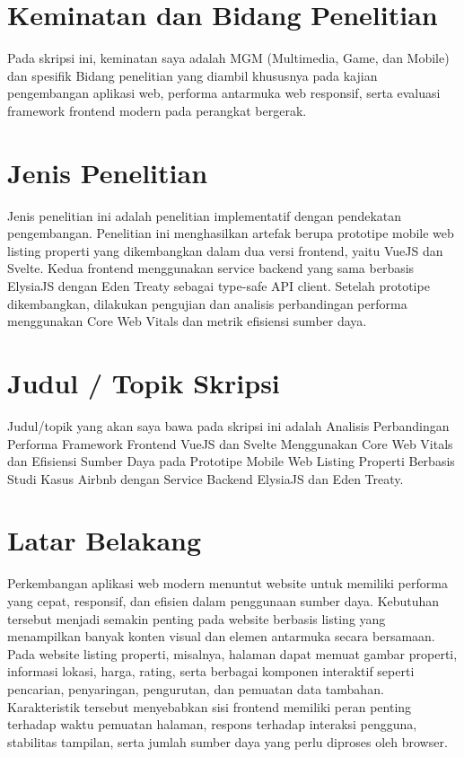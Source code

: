 \documentclass[12pt,a4paper]{report}
\begin{document}
\section{Keminatan dan Bidang Penelitian}
Pada skripsi ini, keminatan saya adalah MGM (Multimedia, Game, dan Mobile) dan spesifik Bidang penelitian yang diambil khususnya pada kajian pengembangan aplikasi web, performa antarmuka web responsif, serta evaluasi framework frontend modern pada perangkat bergerak.

\section{Jenis Penelitian}
Jenis penelitian ini adalah penelitian implementatif dengan pendekatan pengembangan. Penelitian ini menghasilkan artefak berupa prototipe mobile web listing properti yang dikembangkan dalam dua versi frontend, yaitu VueJS dan Svelte. Kedua frontend menggunakan service backend yang sama berbasis ElysiaJS dengan Eden Treaty sebagai type-safe API client. Setelah prototipe dikembangkan, dilakukan pengujian dan analisis perbandingan performa menggunakan Core Web Vitals dan metrik efisiensi sumber daya.

\section{Judul / Topik Skripsi}
Judul/topik yang akan saya bawa pada skripsi ini adalah Analisis Perbandingan Performa Framework Frontend VueJS dan Svelte Menggunakan Core Web Vitals dan Efisiensi Sumber Daya pada Prototipe Mobile Web Listing Properti Berbasis Studi Kasus Airbnb dengan Service Backend ElysiaJS dan Eden Treaty.

\section{Latar Belakang}
Perkembangan aplikasi web modern menuntut website untuk memiliki performa yang cepat, responsif, dan efisien dalam penggunaan sumber daya. Kebutuhan tersebut menjadi semakin penting pada website berbasis listing yang menampilkan banyak konten visual dan elemen antarmuka secara bersamaan. Pada website listing properti, misalnya, halaman dapat memuat gambar properti, informasi lokasi, harga, rating, serta berbagai komponen interaktif seperti pencarian, penyaringan, pengurutan, dan pemuatan data tambahan. Karakteristik tersebut menyebabkan sisi frontend memiliki peran penting terhadap waktu pemuatan halaman, respons terhadap interaksi pengguna, stabilitas tampilan, serta jumlah sumber daya yang perlu diproses oleh browser.
\end{document}
